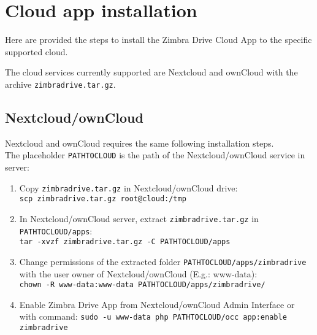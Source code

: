 \section{Cloud app installation}

Here are provided the steps to install the Zimbra Drive Cloud App to the specific supported cloud.
\begin{comment}
WARNING:
\end{comment}
\begin{warning}
The cloud services currently supported are Nextcloud and ownCloud with the archive \texttt{zimbradrive.tar.gz}.
\end{warning}

\subsection{Nextcloud/ownCloud}\label{==subsec:NextcloudownCloudInstallation==}
    Nextcloud and ownCloud requires the same following installation steps.\\
    The placeholder \texttt{PATH\textunderscore TO\textunderscore CLOUD} is the path of the Nextcloud/ownCloud service in server:

    \begin{enumerate}
        \item Copy \texttt{zimbradrive.tar.gz} in Nextcloud/ownCloud drive:\\
        \texttt{scp zimbradrive.tar.gz root@cloud:/tmp}

        \item In Nextcloud/ownCloud server, extract \texttt{zimbradrive.tar.gz}  in \texttt{PATH\textunderscore TO\textunderscore CLOUD/apps}:\\
        \texttt{tar -xvzf zimbradrive.tar.gz -C \texttt{PATH\textunderscore TO\textunderscore CLOUD}/apps}
        
        \item Change permissions of the extracted folder \texttt{PATH\textunderscore TO\textunderscore CLOUD/apps/zimbradrive}
        with the user owner of Nextcloud/ownCloud (E.g.: www-data):\\
        \texttt{chown -R www-data:www-data PATH\textunderscore TO\textunderscore CLOUD/apps/zimbradrive/}
        
        \item Enable Zimbra Drive App from Nextcloud/ownCloud Admin Interface or with command: %
        \texttt{sudo -u www-data php PATH\textunderscore TO\textunderscore CLOUD/occ app:enable zimbradrive}
    \end{enumerate}

